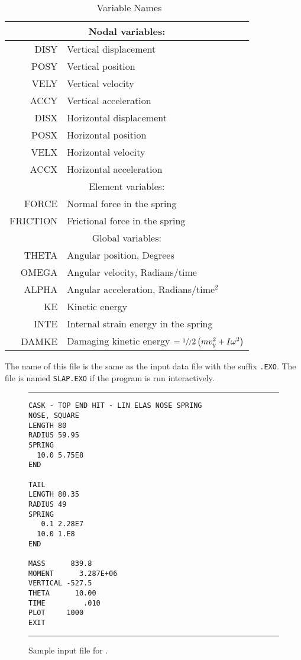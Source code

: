 \begin{table}
\begin{center}
\caption{\EXO\ Variable Names}\label{seatab}
\begin{tabular}{|r|l|}\hline
\multicolumn{2}{|c|}{Nodal variables:}\\ \hline
\sf DISY      & Vertical displacement\\
\sf POSY      & Vertical position\\
\sf VELY      & Vertical velocity\\
\sf ACCY      & Vertical acceleration\\
\sf DISX      & Horizontal displacement\\
\sf POSX      & Horizontal position\\
\sf VELX      & Horizontal velocity\\
\sf ACCX      & Horizontal acceleration\\ \hline\hline
\multicolumn{2}{|c|}{Element variables:}\\ \hline
\sf FORCE     & Normal force in the spring\\
\sf FRICTION  & Frictional force in the spring\\ \hline\hline
\multicolumn{2}{|c|}{Global variables:}\\ \hline
\sf THETA     & Angular position, Degrees\\
\sf OMEGA     & Angular velocity, Radians/time\\
\sf ALPHA     & Angular acceleration, Radians/time${}^2$\\
\sf KE        & Kinetic energy\\
\sf INTE      & Internal strain energy in the spring\\
\sf DAMKE     & Damaging kinetic energy
                $=\sfrac1/2 \left(m v_y^2 + I \omega^2\right)$ \\ \hline
\end{tabular}
\end{center}
\end{table}
The name of this file is the same as the input data file with the suffix
{\tt .EXO}.  The file is named {\tt SLAP.EXO} if the program is run
interactively.

\begin{figure}
\hrule\small
\begin{verbatim}
CASK - TOP END HIT - LIN ELAS NOSE SPRING
NOSE, SQUARE
LENGTH 80
RADIUS 59.95
SPRING
  10.0 5.75E8
END

TAIL
LENGTH 88.35
RADIUS 49
SPRING
   0.1 2.28E7
  10.0 1.E8
END

MASS      839.8
MOMENT      3.287E+06
VERTICAL -527.5
THETA      10.00
TIME         .010
PLOT     1000
EXIT
\end{verbatim}
\hrule
\caption{Sample input file for \SLAP.}\label{sampinput}
\end{figure}

